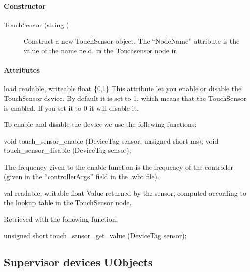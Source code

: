 \paragraph{Constructor}

\noindent
\begin{description}
\item[{TouchSensor (string )}] Construct a new
  TouchSensor object. The ``NodeName'' attribute is the value of the
  name field, in the Touchsensor node in \webots
\end{description}

\paragraph{Attributes}

\noindent
\begin{itemize}
\begin{attribute}{load}
  {readable, writeable}
  {float}
  {\{0,1\}}
  This attribute let you enable or disable the
  TouchSensor device.  By default it is set to 1, which means that the
  TouchSensor is enabled. If you set it to 0 it will disable it.

  To enable and disable the device we use the following \webots
  functions:
\begin{cxx}
void touch_sensor_enable (DeviceTag sensor, unsigned short ms);
void touch_sensor_disable (DeviceTag sensor);
\end{cxx}

The frequency given to the enable function is the frequency of the
\urbi controller (given in the ``controllerArgs'' field in the .wbt
file).
\end{attribute}

\begin{attribute}{val}
  {readable, writable}
  {float}
  {}
  Value returned by the sensor, computed according to the
  lookup table in the TouchSensor node.

  Retrieved with the following \webots function:
\begin{cxx}
unsigned short touch_sensor_get_value  (DeviceTag sensor);
\end{cxx}
\end{attribute}

\end{itemize}

\subsection{Supervisor devices UObjects}

